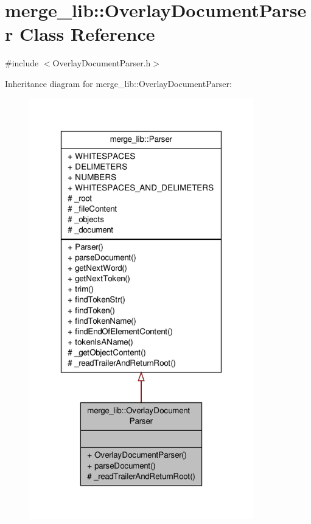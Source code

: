 \hypertarget{classmerge__lib_1_1_overlay_document_parser}{\section{merge\-\_\-lib\-:\-:Overlay\-Document\-Parser Class Reference}
\label{d0/dd3/classmerge__lib_1_1_overlay_document_parser}
}


{\ttfamily \#include $<$Overlay\-Document\-Parser.\-h$>$}



Inheritance diagram for merge\-\_\-lib\-:\-:Overlay\-Document\-Parser\-:
\nopagebreak
\begin{figure}[H]
\begin{center}
\leavevmode
\includegraphics[width=276pt]{d8/d32/classmerge__lib_1_1_overlay_document_parser__inherit__graph}
\end{center}
\end{figure}


